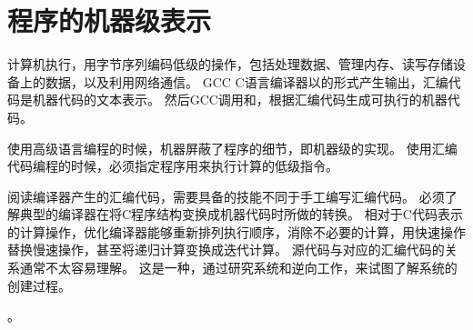 
\chapter{程序的机器级表示}
{
    计算机执行，用字节序列编码低级的操作，包括处理数据、管理内存、读写存储设备上的数据，以及利用网络通信。
    GCC C语言编译器以的形式产生输出，汇编代码是机器代码的文本表示。
    然后GCC调用和，根据汇编代码生成可执行的机器代码。

    使用高级语言编程的时候，机器屏蔽了程序的细节，即机器级的实现。
    使用汇编代码编程的时候，必须指定程序用来执行计算的低级指令。

    阅读编译器产生的汇编代码，需要具备的技能不同于手工编写汇编代码。
    必须了解典型的编译器在将C程序结构变换成机器代码时所做的转换。
    相对于C代码表示的计算操作，优化编译器能够重新排列执行顺序，消除不必要的计算，用快速操作替换慢速操作，甚至将递归计算变换成迭代计算。
    源代码与对应的汇编代码的关系通常不太容易理解。
    这是一种，通过研究系统和逆向工作，来试图了解系统的创建过程。

    。

    
    
    
    
    
    
    
    
    
    
    
}

\cleardoublepage

\endinput
